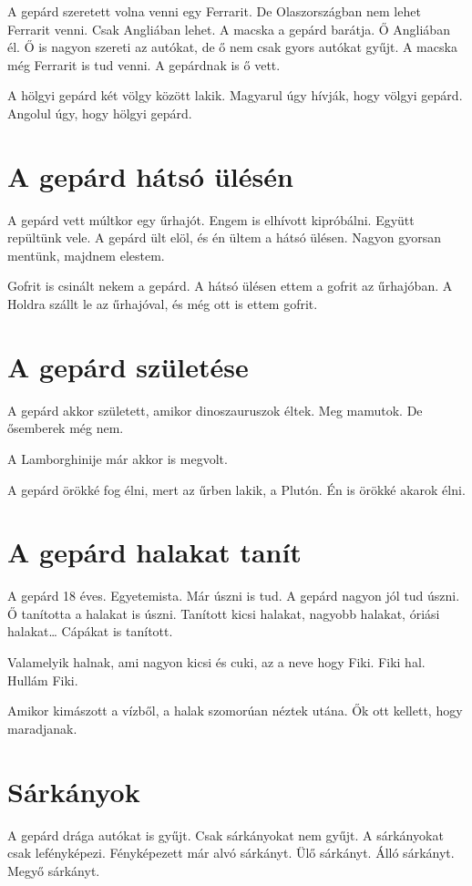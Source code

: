 \documentclass[12pt]{memoir}
\newcommand{\image}[1]{%
\incgraph[documentpaper][keepaspectratio=true,width=\paperwidth,height=\paperheight]{#1}}
\begin{document}
A gepárd szeretett volna venni egy Ferrarit. De Olaszországban nem lehet
Ferrarit venni. Csak Angliában lehet. A macska a gepárd barátja. Ő Angliában
él. Ő is nagyon szereti az autókat, de ő nem csak gyors autókat gyűjt. A macska
még Ferrarit is tud venni. A gepárdnak is ő vett.

A hölgyi gepárd két völgy között lakik. Magyarul úgy hívják, hogy völgyi
gepárd. Angolul úgy, hogy hölgyi gepárd.


\section{A gepárd hátsó ülésén}
A gepárd vett múltkor egy űrhajót. Engem is elhívott kipróbálni. Együtt
repültünk vele. A gepárd ült elöl, és én ültem a hátsó ülésen. Nagyon gyorsan
mentünk, majdnem elestem.

Gofrit is csinált nekem a gepárd. A hátsó ülésen ettem a gofrit az űrhajóban. A
Holdra szállt le az űrhajóval, és még ott is ettem gofrit.

 
\section{A gepárd születése}
A gepárd akkor született, amikor dinoszauruszok éltek. Meg mamutok. De
ősemberek még nem.

A Lamborghinije már akkor is megvolt.

A gepárd örökké fog élni, mert az űrben lakik, a Plutón. Én is örökké akarok
élni.
\image{gepard.png}


\section{A gepárd halakat tanít}
A gepárd 18 éves. Egyetemista. Már úszni is tud. A gepárd nagyon jól tud úszni.
Ő tanította a halakat is úszni. Tanított kicsi halakat, nagyobb halakat, óriási
halakat… Cápákat is tanított.

Valamelyik halnak, ami nagyon kicsi és cuki, az a neve hogy Fiki. Fiki hal.
Hullám Fiki.

Amikor kimászott a vízből, a halak szomorúan néztek utána. Ők ott kellett, hogy
maradjanak.


\section{Sárkányok}
A gepárd drága autókat is gyűjt. Csak sárkányokat nem gyűjt. A sárkányokat csak
lefényképezi. Fényképezett már alvó sárkányt. Ülő sárkányt. Álló sárkányt.
Megyő sárkányt.
\end{document}
